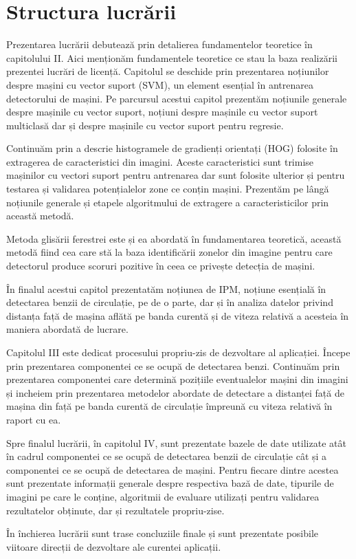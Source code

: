 \section{Structura lucrării}

Prezentarea lucrării debutează prin detalierea fundamentelor teoretice în capitolului II. Aici menționăm fundamentele teoretice ce stau la baza realizării prezentei lucrări de licență. 
Capitolul se deschide prin prezentarea noțiunilor despre mașini cu vector suport (SVM), un element esențial în antrenarea detectorului de mașini. Pe parcursul acestui capitol prezentăm noțiunile generale despre mașinile cu vector suport, noțiuni despre mașinile cu vector suport multiclasă dar și despre mașinile cu vector suport pentru regresie.

Continuăm prin a descrie histogramele de gradienți orientați (HOG) folosite în extragerea de caracteristici din imagini. Aceste caracteristici sunt trimise mașinilor cu vectori suport pentru antrenarea dar sunt folosite ulterior și pentru testarea și validarea potențialelor zone ce conțin mașini. 
Prezentăm pe lângă noțiunile generale și etapele algoritmului de extragere a caracteristicilor prin această metodă. 

Metoda glisării ferestrei este și ea abordată în fundamentarea teoretică, această metodă fiind cea care stă la baza identificării zonelor din imagine pentru care detectorul produce scoruri pozitive în ceea ce privește detecția de mașini.

În finalul acestui capitol prezentatăm noțiunea de IPM, noțiune esențială în detectarea benzii de circulație, pe de o parte, dar și în analiza datelor privind distanța față de mașina aflătă pe banda curentă și de viteza relativă a acesteia în maniera abordată de lucrare.

Capitolul III este dedicat procesului propriu-zis de dezvoltare al aplicației. Începe prin prezentarea componentei ce se ocupă de detectarea benzi. Continuăm prin prezentarea componentei care determină pozițiile eventualelor mașini din imagini și incheiem prin prezentarea metodelor abordate de detectare a distanței față de mașina din față pe banda curentă de circulație împreună cu viteza relativă în raport cu ea.

Spre finalul lucrării, în capitolul IV, sunt prezentate bazele de date utilizate atât în cadrul componentei ce se ocupă de detectarea benzii de circulație cât și a componentei ce se ocupă de detectarea de mașini. Pentru fiecare dintre acestea sunt prezentate informații generale despre respectiva bază de date, tipurile de imagini pe care le conține, algoritmii de evaluare utilizați pentru validarea rezultatelor obținute, dar și rezultatele propriu-zise.

În închierea lucrării sunt trase concluziile finale și sunt prezentate posibile viitoare direcții de dezvoltare ale curentei aplicații.